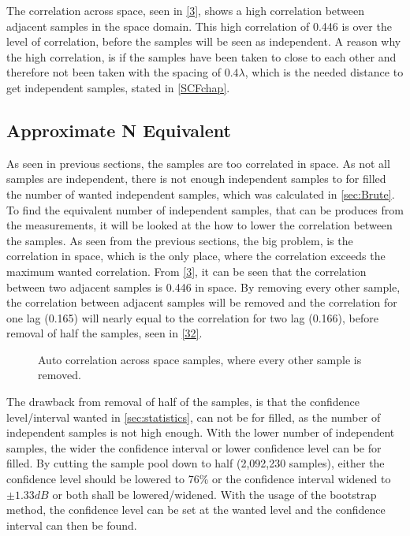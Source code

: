 The correlation across space, seen in \autoref{3}, shows a high correlation between adjacent samples in the space domain. This high correlation of 0.446 is over the level of correlation, before the samples will be seen as independent. A reason why the high correlation, is if the samples have been taken to close to each other and therefore not been taken with the spacing of $0.4 \lambda$, which is the needed distance to get independent samples, stated in \autoref{SCFchap}.


\subsection{Approximate N Equivalent}


As seen in previous sections, the samples are too correlated in space. As not all samples are independent, there is not enough independent samples to for filled the number of wanted independent samples, which was calculated in \autoref{sec:Brute}. To find the equivalent number of independent samples, that can be produces from the measurements, it will be looked at the how to lower the correlation between the samples. As seen from the previous sections, the big problem, is the correlation in space, which is the only place, where the correlation exceeds the maximum wanted correlation. From \autoref{3}, it can be seen that the correlation between two adjacent samples is 0.446 in space. By removing every other sample, the correlation between adjacent samples will be removed and the correlation for one lag (0.165) will nearly equal to the correlation for two lag (0.166), before removal of half the samples, seen in \autoref{32}.


\begin{figure}[H]
\begin{center}

\caption{Auto correlation across space samples, where every other sample is removed.}
\label{32}
\end{center}
\end{figure}

The drawback from removal of half of the samples, is that the confidence level/interval wanted in \autoref{sec:statistics}, can not be for filled, as the number of independent samples is not high enough. With the lower number of independent samples, the wider the confidence interval or lower confidence level can be for filled. By cutting the sample pool down to half (2,092,230 samples), either the confidence level should be lowered to 76\% or the confidence interval widened to $\pm 1.33dB$ or both shall be lowered/widened. With the usage of the bootstrap method, the confidence level can be set at the wanted level and the confidence interval can then be found.


